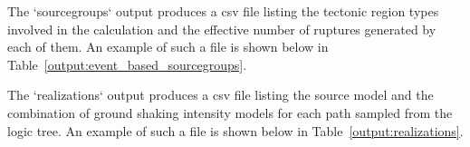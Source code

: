 


The `sourcegroups` output produces a csv file listing the tectonic region
types involved in the calculation and the effective number of ruptures
generated by each of them. An example of such a file is shown below in
Table~\ref{output:event_based_sourcegroups}.




The `realizations` output produces a csv file listing the source model and the
combination of ground shaking intensity models for each path sampled from the
logic tree. An example of such a file is shown below in
Table~\ref{output:realizations}.

